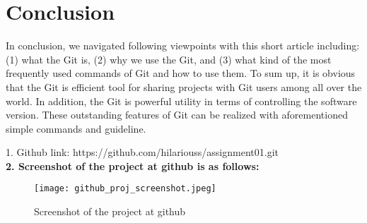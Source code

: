 \documentclass{article}
\begin{document}
\section{Conclusion}
In conclusion, we navigated following viewpoints with this short article including: (1) what the Git is, (2) why we use the Git, and (3) what kind of the most frequently used commands of Git and how to use them. To sum up, it is obvious that the Git is efficient tool for sharing projects with Git users among all over the world. In addition, the Git is powerful utility in terms of controlling the software version. These outstanding features of Git can be realized with aforementioned simple commands and guideline.

\newpage
\begin{appendices}
1. Github link: https://github.com/hilariouss/assignment01.git \\
\textbf{2. Screenshot of the project at github is as follows: }
\begin{figure}[h]
    \centering
    \texttt{[image: github\_proj\_screenshot.jpeg]}
    \caption{Screenshot of the project at github}
    \label{fig:github_proj_screenshot}
\end{figure}

\end{appendices}
\end{document}

